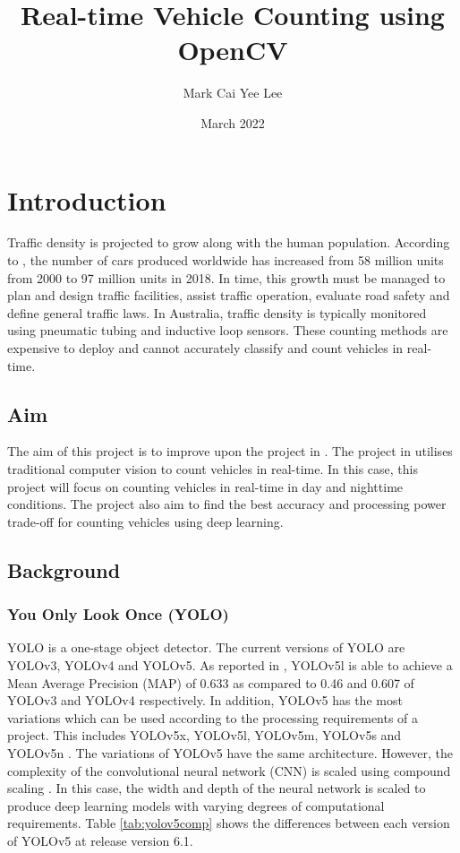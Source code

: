 \documentclass[12pt,a4paper,fleqn]{report}
\title{Real-time Vehicle Counting using OpenCV}
\author{Mark Cai Yee Lee}
\date{March 2022}
\begin{document}
\maketitle

\chapter{Introduction}

Traffic density is projected to grow along with the human population. 
According to \cite{placek:2022}, the number of cars produced worldwide has increased from 58 million
units from 2000 to 97 million units in 2018.
In time, this growth must be managed to plan and design traffic facilities, assist traffic
operation, evaluate road safety and define general traffic laws.
In Australia, traffic density is typically monitored using pneumatic tubing and inductive loop
sensors. 
These counting methods are expensive to deploy and cannot accurately classify and count vehicles in
real-time.

\section{Aim}
The aim of this project is to improve upon the project in \cite{}. 
The project in \cite{} utilises traditional computer vision to count vehicles in real-time. 
In this case, this project will focus on counting vehicles in real-time in day and nighttime
conditions. 
The project also aim to find the best accuracy and processing power trade-off for counting
vehicles using deep learning.

\section{Background}

\subsection{You Only Look Once (YOLO)}
YOLO is a one-stage object detector.
The current versions of YOLO are YOLOv3, YOLOv4 \cite{yolov4:2020} and YOLOv5.
As reported in \cite{compareyolo345:2022}, YOLOv5l is able to achieve a Mean Average Precision (MAP) of 0.633 as compared to 0.46 and 0.607 of YOLOv3 and YOLOv4 respectively. 
In addition, YOLOv5 has the most variations which can be used according to the processing requirements of a
project.
This includes YOLOv5x, YOLOv5l, YOLOv5m, YOLOv5s and YOLOv5n \cite{yolov5git:2022}.
The variations of YOLOv5 have the same architecture. 
However, the complexity of the convolutional neural network (CNN) is scaled using compound scaling
\cite{efficentdet:2019,efficientnet:2019}. 
In this case, the width and depth of the neural network is scaled to produce deep learning models
with varying degrees of computational requirements.
Table \ref{tab:yolov5comp} shows the differences between each version of YOLOv5 at release version 6.1. 
\end{document}
